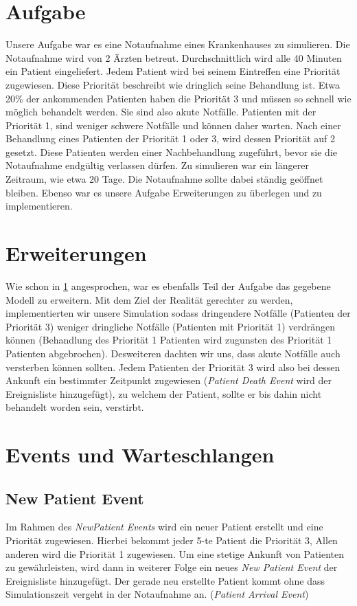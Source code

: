 \documentclass[12pt,fleqn,a4paper]{article}
\begin{document}
\section{Aufgabe}\label{sec:Aufgabe}
Unsere Aufgabe war es eine Notaufnahme eines Krankenhauses zu simulieren. Die Notaufnahme wird von 2 \"{A}rzten betreut. Durchschnittlich wird alle 40 Minuten ein Patient eingeliefert. Jedem Patient wird bei seinem Eintreffen eine Priorit\"{a}t zugewiesen.
Diese Priorit\"{a}t beschreibt wie dringlich seine Behandlung ist.
Etwa 20\% der ankommenden Patienten haben die Priorit\"{a}t 3 und m\"{u}ssen so schnell wie m\"{o}glich behandelt werden. Sie sind also akute Notf\"{a}lle. Patienten mit der Priorit\"{a}t 1, sind weniger schwere Notf\"{a}lle und k\"{o}nnen daher warten. Nach einer Behandlung eines Patienten der Priorit\"{a}t 1 oder 3, wird dessen Priorit\"{a}t auf 2 gesetzt. Diese Patienten werden einer Nachbehandlung zugef\"{u}hrt, bevor sie die Notaufnahme endg\"{u}ltig verlassen d\"{u}rfen.
Zu simulieren war ein l\"{a}ngerer Zeitraum, wie etwa 20 Tage. Die Notaufnahme sollte dabei st\"{a}ndig ge\"{o}ffnet bleiben.
Ebenso war es unsere Aufgabe Erweiterungen zu \"{u}berlegen und zu implementieren.

\section{Erweiterungen}
Wie schon in \ref{sec:Aufgabe} angesprochen, war es ebenfalls Teil der Aufgabe das gegebene Modell zu erweitern.
Mit dem Ziel der Realit\"{a}t gerechter zu werden, implementierten wir unsere Simulation sodass dringendere Notf\"{a}lle (Patienten der Priorit\"{a}t 3) weniger dringliche Notf\"{a}lle (Patienten mit Priorit\"{a}t 1) verdr\"{a}ngen k\"{o}nnen (Behandlung des Priorit\"{a}t 1 Patienten wird zugunsten des Priorit\"{a}t 1 Patienten abgebrochen). 
Desweiteren dachten wir uns, dass akute Notf\"{a}lle auch versterben k\"{o}nnen sollten. Jedem Patienten der Priorit\"{a}t 3 wird also bei dessen Ankunft ein bestimmter Zeitpunkt zugewiesen (\textit{Patient Death Event} wird der Ereignisliste hinzugef\"{u}gt), zu welchem der Patient, sollte er bis dahin nicht behandelt worden sein, verstirbt.
\newpage

\section{Events und Warteschlangen}

\subsection{New Patient Event}
Im Rahmen des \textit{NewPatient Events} wird ein neuer Patient erstellt und eine Priorit\"{a}t zugewiesen.
Hierbei bekommt jeder 5-te Patient die Priorit\"{a}t 3,
Allen anderen wird die Priorit\"{a}t 1 zugewiesen. Um eine stetige Ankunft von Patienten zu gew\"{a}hrleisten, wird dann in weiterer Folge ein neues \textit{New Patient Event} der Ereignisliste hinzugef\"{u}gt. Der gerade neu erstellte Patient kommt ohne dass Simulationszeit vergeht in der Notaufnahme an. (\textit{Patient Arrival Event})
\end{document}
